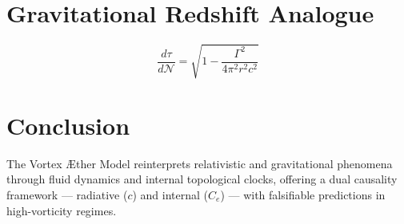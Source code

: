 \documentclass[12pt]{article}
\begin{document}
\section*{Gravitational Redshift Analogue}

\begin{equation}
\boxed{
    \frac{d\tau}{d\mathcal{N}} = \sqrt{1 - \frac{\Gamma^2}{4\pi^2 r^2 c^2}}
}
\label{eq:gravitational-redshift}
\end{equation}

\section*{Conclusion}

The Vortex Æther Model reinterprets relativistic and gravitational phenomena through fluid dynamics and internal topological clocks, offering a dual causality framework — radiative (\( c \)) and internal (\( C_e \)) — with falsifiable predictions in high-vorticity regimes.
\end{document}
